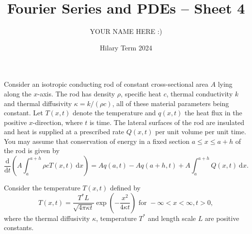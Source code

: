 \documentclass[answers]{exam}
\title{Fourier Series and PDEs -- Sheet 4}
\author{YOUR NAME HERE :)}
\date{Hilary Term 2024}
\begin{document}
\maketitle
\begin{questions}

\question%
Consider an isotropic conducting rod of constant cross-sectional area $A$ lying along the $x$-axis. The rod has density $\rho$, specific heat $c$, thermal conductivity $k$ and thermal diffusivity $\kappa=k /(\rho c)$, all of these material parameters being constant. Let $T(x, t)$ denote the temperature and $q(x, t)$ the heat flux in the positive $x$-direction, where $t$ is time. The lateral surfaces of the rod are insulated and heat is supplied at a prescribed rate $Q(x, t)$ per unit volume per unit time. You may assume that conservation of energy in a fixed section $a \leq x \leq a+h$ of the rod is given by \[
	\frac{\mathrm{d}}{\mathrm{d} t}\left(A \int_{a}^{a+h} \rho c T(x, t) \mathrm{~d} x\right)=A q(a, t)-A q(a+h, t)+A \int_{a}^{a+h} Q(x, t) \mathrm{~d} x.
\]



\question%
Consider the temperature $T(x, t)$ defined by \[
	T(x, t)=\frac{T^{*} L}{\sqrt{4 \pi \kappa t}} \exp \left(-\frac{x^{2}}{4 \kappa t}\right) \text { for }-\infty<x<\infty, t>0,
\] where the thermal diffusivity $\kappa$, temperature $T^{*}$ and length scale $L$ are positive constants.
\begin{parts}

\end{parts}
\end{questions}
\end{document}
